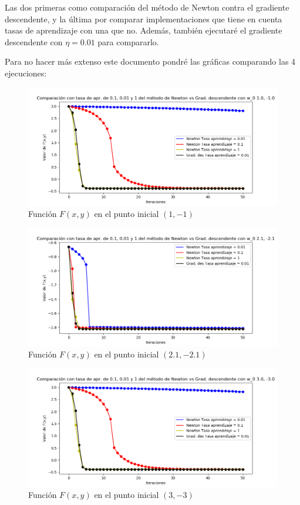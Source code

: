 \documentclass[12pt, spanish]{article}
\begin{document}
Las dos primeras como comparación del método de Newton contra el gradiente descendente, y la última por comparar implementaciones que tiene en cuenta tasas de aprendizaje con una que no. Además, también ejecutaré el gradiente descendente con $\eta = 0.01$ para compararlo.

Para no hacer más extenso este documento pondré las gráficas comparando las 4 ejecuciones:


\begin{figure}[H]
  \centering
      \includegraphics[scale = 0.70]{ej3-1.png}
 		 \caption{Función $F(x,y)$ en el punto inicial $(1,-1)$}
  		\label{fig:ej3-1}

\end{figure}

\begin{figure}[H]
  \centering
      \includegraphics[scale = 0.70]{ej3-2.png}
 		 \caption{Función $F(x,y)$ en el punto inicial $(2.1,-2.1)$}
  		\label{fig:ej3-2}

\end{figure}

\begin{figure}[H]
  \centering
      \includegraphics[scale = 0.70]{ej3-3.png}
 		 \caption{Función $F(x,y)$ en el punto inicial $(3,-3)$}
  		\label{fig:ej3-3}

\end{figure}
\end{document}
